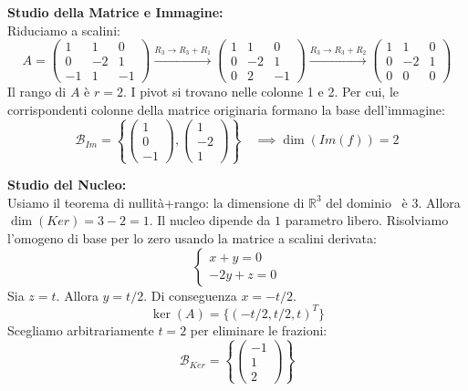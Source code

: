 \begin{solbox}
\textbf{Studio della Matrice e Immagine:}\\
Riduciamo a scalini:
$$ A = \begin{pmatrix} 1 & 1 & 0 \\ 0 & -2 & 1 \\ -1 & 1 & -1 \end{pmatrix} \xrightarrow{R_3 \to R_3 + R_1} \begin{pmatrix} 1 & 1 & 0 \\ 0 & -2 & 1 \\ 0 & 2 & -1 \end{pmatrix} \xrightarrow{R_3 \to R_3 + R_2} \begin{pmatrix} 1 & 1 & 0 \\ 0 & -2 & 1 \\ 0 & 0 & 0 \end{pmatrix} $$
Il rango di $A$ è $r=2$. I pivot si trovano nelle colonne 1 e 2.
Per cui, le corrispondenti colonne della matrice originaria formano la base dell'immagine:
$$ \mathcal{B}_{Im} = \left\{ \begin{pmatrix} 1 \\ 0 \\ -1 \end{pmatrix}, \begin{pmatrix} 1 \\ -2 \\ 1 \end{pmatrix} \right\} \quad \implies \dim(Im(f)) = 2 $$

\textbf{Studio del Nucleo:}\\
Usiamo il teorema di nullità+rango: la dimensione di $\mathbb{R}^3$ del dominio \ è $3$. Allora $\dim(Ker) = 3 - 2 = 1$. Il nucleo dipende da $1$ parametro libero.
Risolviamo l'omogeno di base per lo zero usando la matrice a scalini derivata:
$$ \begin{cases} x + y = 0 \\ -2y + z = 0 \end{cases} $$
Sia $z = t$. Allora $y = t/2$. Di conseguenza $x = -t/2$.
$$ \ker(A) = \{ (-t/2, t/2, t)^T \} $$
Scegliamo arbitrariamente $t=2$ per eliminare le frazioni:
$$ \mathcal{B}_{Ker} = \left\{ \begin{pmatrix} -1 \\ 1 \\ 2 \end{pmatrix} \right\} $$
\end{solbox}
